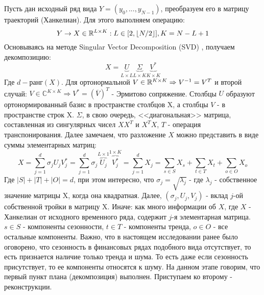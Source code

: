 Пусть дан исходный ряд вида  ${Y = (y_0, ..., y_{N - 1})}$, преобразуем его в матрицу траекторий (Ханкелиан). Для этого выполняем операцию:
\begin{equation} \label{eq::hankelisation}
	Y \rightarrow X \in \mathbb{R}^{L \times K}: L \in [2, \lfloor N / 2 \rfloor], K = N - L + 1
\end{equation}
\noindent Основываясь на методе Singular Vector Decomposition (SVD) \cite{martin2012svd}, получаем декомпозицию:
\begin{equation}
	X = \underbrace{U}_{L \times L} \underbrace{\Sigma}_{L \times K} \underbrace{V^*}_{K \times K}
\end{equation}
Где ${d - \textbf{ранг}(X)}$. Для ортонормальной $V \in \mathbb{R}^{K \times K} \Rightarrow V^{-1} = V^T$ и второй случай: ${V \in \mathbb{C}^{K \times K} \Rightarrow V^* = \left(\overline{V}\right)^T}$ - Эрмитово сопряжение. Столбцы ${U}$ образуют ортонормированный базис в пространстве столбцов X, а столбцы ${V}$ - в пространстве строк X. ${\Sigma}$, в свою очередь, <<диагональная>> матрица, составленная из сингулярных чисел ${XX^T}$ и ${X^TX}$, $T$ - операция транспонирования. Далее замечаем, что разложение  $X$ можно представить в виде суммы элементарных матриц:
\begin{equation} \label{eq::ssa_decomposition}
	X = \sum_{j = 1}^{d} \sigma_j U_j V_j^* = \sum_{j = 1}^{d} \sigma_j \overbrace{U_j}^{L \times 1} \overbrace{V_j^*}^{1 \times K} = \sum_{j = 1}^{d} X_j = \sum_{s \in S} X_s + \sum_{t \in T} X_t + \sum_{o \in O} X_o
\end{equation}
Где $|S| + |T| + |O| = d$, при этом интересно, что $\sigma_j = \sqrt{\lambda_j}$ - где $\lambda_j$ - собственное значение матрицы X, когда она квадратная. Далее, $(\sigma_j, U_j, V_j)$ - вклад $j$-ой собственной тройки в матрицу X. Иначе: как много информации об $X$, где $X$ - Ханкелиан от исходного временного ряда, содержит $j$-я элементарная матрица. $s \in S$ - компоненты сезонности, $t \in T$ - компоненты тренда, $o \in O$ - все остальные компоненты. Важно, что в настоящем исследовании ранее было оговорено, что сезонность в финансовых рядах подобного вида отсутствует, то есть признается наличие только тренда и шума. То есть даже если сезонность присутствует, то ее компоненты относятся к шуму. На данном этапе говорим, что первый пункт плана (декомпозиция) выполнен. Приступаем ко второму - реконструкции.

